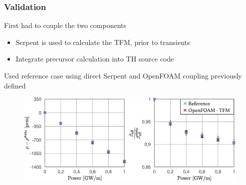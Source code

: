 \begin{frame}
  \frametitle{Validation}
  First had to couple the two components
        \begin{itemize}
                \item Serpent is used to calculate the TFM, prior to transients
                \item Integrate precursor calculation into TH source code     
        \end{itemize}
  Used reference case using direct Serpent and OpenFOAM coupling previously defined

 
  \begin{figure}
        \centering
        \includegraphics[scale=0.65]{JC-Oct16/reference.jpg}
        \label{fig:reference}
  \end{figure}
              
\end{frame}
